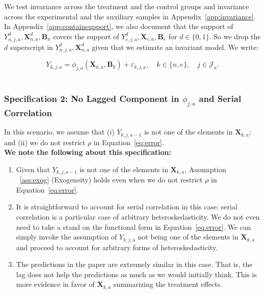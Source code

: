 \noindent We test invariance across the treatment and the control groups and invariance across the experimental and the auxiliary samples  in Appendix~\ref{app:invariance}.\\

\noindent In Appendix~\ref{app:containsupport}, we also document that the support of $Y_{n,j,a}^d, \bm{X}_{n,a}^d, \bm{B}_{n}$ covers the support of $Y_{e,j,a}^d, \bm{X}_{e,a}, \bm{B}_{e}$ for $d \in \{0, 1\}$. So we drop the $d$ superscript in $Y_{n,j,a}^d, \bm{X}_{n,a}^d$ given that we estimate an invariant model. We write:

\begin{equation}\label{eq:routcome}
Y_{k,j,a} = \phi_{j,a} (\bm{X}_{k,a}, \bm{B}_k) + \varepsilon_{k,j,a}, \quad k \in \{n,e\}, \quad j \in \mathcal{J}_a.
\end{equation}\\

\subsubsection{Specification 2: No Lagged Component in $\phi_{j,a}$ and Serial Correlation} \label{app:spec2}

\noindent In this scenario, we assume that (i)  $Y_{k,j,a-1}$ is not one of the elements in $\bm{X}_{k,a}$; and (ii) we do not restrict $\rho$ in Equation~\eqref{eq:error}.\\

\noindent \textbf{We note the following about this specification:}

\begin{enumerate}

\item Given that $Y_{k,j,a-1}$ is not one of the elements in $\bm{X}_{k,a}$, Assumption ~\ref{ass:exog} (Exogeneity) holds even when we do not restrict $\rho$ in Equation~\eqref{eq:error}. 

\item It is straightforward to account for serial correlation in this case: serial correlation is a particular case of arbitrary heteroskedasticity. We do not even need to take a stand on the functional form in Equation~\eqref{eq:error}. We can simply invoke the assumption of $Y_{k,j,a}$ not being one of the elements in $\bm{X}_{k,a}$ and proceed to account for arbitrary forms of heteroskedasticity. 

\item The predictions in the paper are extremely similar in this case. That is, the lag does not help the predictions as much as we would initially think. This is more evidence in favor of $\bm{X}_{k,a}$ summarizing the treatment effects.

\end{enumerate}


